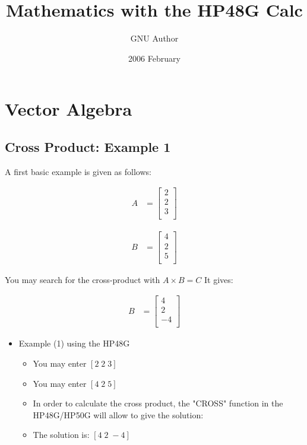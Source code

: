 \documentclass[11pt]{article}
\begin{document}
\title{Mathematics with the HP48G Calc}
\author{GNU Author}
\date{2006 February}
\maketitle

\section{Vector Algebra}
\subsection{Cross Product: Example 1}

A first basic example is given as follows:

\begin{align}
A &= \begin{bmatrix}
   2 \\
   2 \\
   3 \\
\end{bmatrix}
\end{align}

\begin{align}
B &= \begin{bmatrix}
   4 \\
   2 \\
   5 \\
\end{bmatrix}
\end{align}

You may search for the cross-product with  $ A \times B = C $
It gives:

\begin{align}
B &= \begin{bmatrix}
   4 \\
   2 \\
   -4 \\
\end{bmatrix}
\end{align}


\begin{itemize}
\item Example (1) using the HP48G
\begin{itemize}
\item You may enter  $ [ 2 \; 2 \; 3 ] $
\item You may enter  $ [ 4 \; 2  \; 5 ] $
\item In order to calculate the cross product, the "CROSS" function in the HP48G/HP50G will allow to give the solution:
\item The solution is:  $ [ 4 \;  2 \; -4 ] $
\end{itemize}
\end{itemize}
\end{document}
